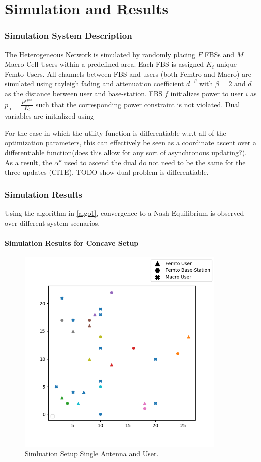 \documentclass[12pt,a4paper]{report}
\begin{document}
\chapter{Simulation and Results}\label{numerical}
\subsection{Simulation System Description}
The Heterogeneous Network is simulated by randomly placing $F$ FBSs and $M$ Macro Cell Users within a predefined area. Each FBS is assigned $K_{\mathrm{f}}$ unique Femto Users. All channels between FBS and users (both Femtro and Macro) are simulated using rayleigh fading and attenuation coefficient $d^{- \beta}$ with $\beta =2$ and $d$ as the distance between user and base-station.
FBS $f$ initializes power to user $i$ as $p_{\mathrm{fi}} = \frac{P^{P_{\mathrm{f}}^{Total}}}{K_{\mathrm{f}}} $ such that the corresponding power constraint is not violated. 
Dual variables are initialized using  
\par
For the case in which the utility function is differentiable w.r.t all of the optimization parameters, this can effectively be seen as a coordinate ascent over a differentiable function(does this allow for any sort of asynchronous updating?). As a result, the $\alpha^{k}$ used to ascend the dual do not need to be the same for the three updates (CITE).
TODO show dual problem is differentiable.


\subsection{Simulation Results}
Using the algorithm in \ref{algo1}, convergence to a Nash Equilibrium is observed over different system scenarios. 
\subsubsection{Simulation Results for Concave Setup}

\begin{figure}[H]
	\includegraphics[width=\textwidth,height = 10cm]{figures/system_figure_single}
	  \caption{Simluation Setup Single Antenna and User.  }
\end{figure}
\end{document}
